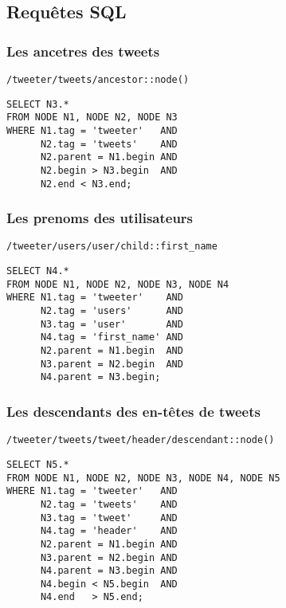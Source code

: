 \subsection{Requêtes SQL}
\subsubsection{Les ancetres des tweets	   }
\begin{verbatim}
/tweeter/tweets/ancestor::node()
\end{verbatim}
\begin{verbatim}
SELECT N3.*
FROM NODE N1, NODE N2, NODE N3
WHERE N1.tag = 'tweeter'   AND
      N2.tag = 'tweets'    AND
      N2.parent = N1.begin AND
      N2.begin > N3.begin  AND
      N2.end < N3.end;
\end{verbatim}

\subsubsection{Les prenoms des utilisateurs}
\begin{verbatim}
/tweeter/users/user/child::first_name
\end{verbatim}
\begin{verbatim}
SELECT N4.*
FROM NODE N1, NODE N2, NODE N3, NODE N4
WHERE N1.tag = 'tweeter'    AND
      N2.tag = 'users'      AND
      N3.tag = 'user'       AND
      N4.tag = 'first_name' AND
      N2.parent = N1.begin  AND
      N3.parent = N2.begin  AND
      N4.parent = N3.begin;
\end{verbatim}

\subsubsection{Les descendants des en-têtes de tweets}
\begin{verbatim}
/tweeter/tweets/tweet/header/descendant::node()
\end{verbatim}
\begin{verbatim}
SELECT N5.*
FROM NODE N1, NODE N2, NODE N3, NODE N4, NODE N5
WHERE N1.tag = 'tweeter'   AND
      N2.tag = 'tweets'    AND
      N3.tag = 'tweet'     AND
      N4.tag = 'header'    AND
      N2.parent = N1.begin AND
      N3.parent = N2.begin AND
      N4.parent = N3.begin AND
      N4.begin < N5.begin  AND
      N4.end   > N5.end;
\end{verbatim}

